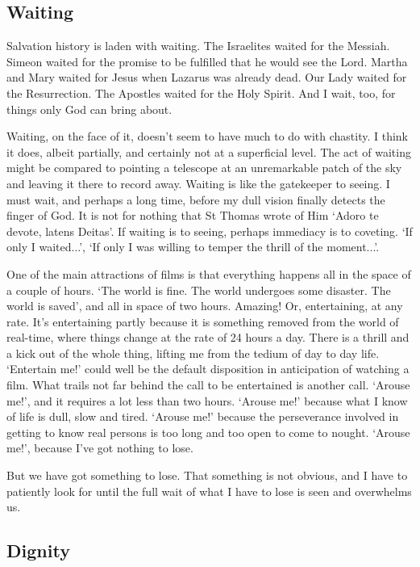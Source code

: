 \documentclass[12pt]{article}
\begin{document}
\subsection*{Waiting}

Salvation history is laden with waiting. The Israelites waited for the Messiah. Simeon waited for the promise to be fulfilled that he would see the Lord. Martha and Mary waited for Jesus when Lazarus was already dead. Our Lady waited for the Resurrection. The Apostles waited for the Holy Spirit. And I wait, too, for things only God can bring about.

Waiting, on the face of it, doesn't seem to have much to do with chastity. I think it does, albeit partially, and certainly not at a superficial level. The act of waiting might be compared to pointing a telescope at an unremarkable patch of the sky and leaving it there to record away. Waiting is like the gatekeeper to seeing. I must wait, and perhaps a long time, before my dull vision finally detects the finger of God. It is not for nothing that St Thomas wrote of Him `Adoro te devote, latens Deitas'. If waiting is to seeing, perhaps immediacy is to coveting. `If only I waited...', `If only I was willing to temper the thrill of the moment...'.

One of the main attractions of films is that everything happens all in the space of a couple of hours. `The world is fine. The world undergoes some disaster. The world is saved', and all in space of two hours. Amazing! Or, entertaining, at any rate. It's entertaining partly because it is something removed from the world of real-time, where things change at the rate of 24 hours a day. There is a thrill and a kick out of the whole thing, lifting me from the tedium of day to day life. `Entertain me!' could well be the default disposition in anticipation of watching a film. What trails not far behind the call to be entertained is another call. `Arouse me!', and it requires a lot less than two hours. `Arouse me!' because what I know of life is dull, slow and tired. `Arouse me!' because the perseverance involved in getting to know real persons is too long and too open to come to nought. `Arouse me!', because I've got nothing to lose.

But we have got something to lose. That something is not obvious, and I have to patiently look for until the full wait of what I have to lose is seen and overwhelms us.

\subsection*{Dignity}
\end{document}
